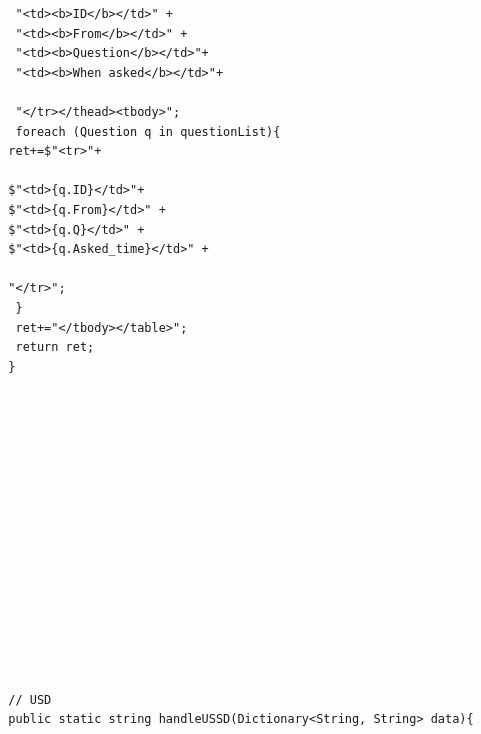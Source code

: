 \documentclass[11pt, a4paper]{article}
\begin{document}
\begin{appendices}
\begin{lstlisting}
   "<td><b>ID</b></td>" +
   "<td><b>From</b></td>" +
   "<td><b>Question</b></td>"+
   "<td><b>When asked</b></td>"+

   "</tr></thead><tbody>";
   foreach (Question q in questionList){
  ret+=$"<tr>"+

  $"<td>{q.ID}</td>"+
  $"<td>{q.From}</td>" +
  $"<td>{q.Q}</td>" +
  $"<td>{q.Asked_time}</td>" +

  "</tr>";
   }
   ret+="</tbody></table>";
   return ret;
  }
















  // USD
  public static string handleUSSD(Dictionary<String, String> data){


\end{lstlisting}
\end{appendices}
\end{document}
